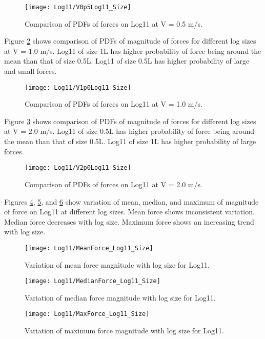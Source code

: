 \begin{figure}
\centering
\texttt{[image: Log11/V0p5Log11\_Size]}
\caption{\label{fig:V0p5Log11_Size}Comparison of PDFs of forces on Log11 at V = 0.5 m/s.}
\end{figure}

\noindent Figure \ref{fig:V1p0Log11_Size} shows comparison of PDFs of magnitude of forces for different log sizes at V = 1.0 m/s. Log11 of size 1L has higher probability of force being around the mean than that of size 0.5L. Log11 of size 0.5L has higher probability of large and small forces.

\begin{figure}
\centering
\texttt{[image: Log11/V1p0Log11\_Size]}
\caption{\label{fig:V1p0Log11_Size}Comparison of PDFs of forces on Log11 at V = 1.0 m/s.}
\end{figure}

\noindent Figure \ref{fig:V2p0Log11_Size} shows comparison of PDFs of magnitude of forces for different log sizes at V = 2.0 m/s. Log11 of size 0.5L has higher probability of force being around the mean than that of size 0.5L. Log11 of size 1L has higher probability of large forces.

\begin{figure}
\centering
\texttt{[image: Log11/V2p0Log11\_Size]}
\caption{\label{fig:V2p0Log11_Size}Comparison of PDFs of forces on Log11 at V = 2.0 m/s.}
\end{figure}

\noindent Figures \ref{fig:MeanForce_Log11_Size}, \ref{fig:MedianForce_Log11_Size}, and \ref{fig:MaxForce_Log11_Size} show variation of mean, median, and maximum of magnitude of force on Log11 at different log sizes. Mean force shows inconsistent variation. Median force decreases with log size. Maximum force shows an increasing trend with log size.

\begin{figure}
\centering
\texttt{[image: Log11/MeanForce\_Log11\_Size]}
\caption{\label{fig:MeanForce_Log11_Size}Variation of mean force magnitude with log size for Log11.}
\end{figure}
\begin{figure}
\centering
\texttt{[image: Log11/MedianForce\_Log11\_Size]}
\caption{\label{fig:MedianForce_Log11_Size}Variation of median force magnitude with log size for Log11.}
\end{figure}
\begin{figure}
\centering
\texttt{[image: Log11/MaxForce\_Log11\_Size]}
\caption{\label{fig:MaxForce_Log11_Size}Variation of maximum force magnitude with log size for Log11.}
\end{figure}

